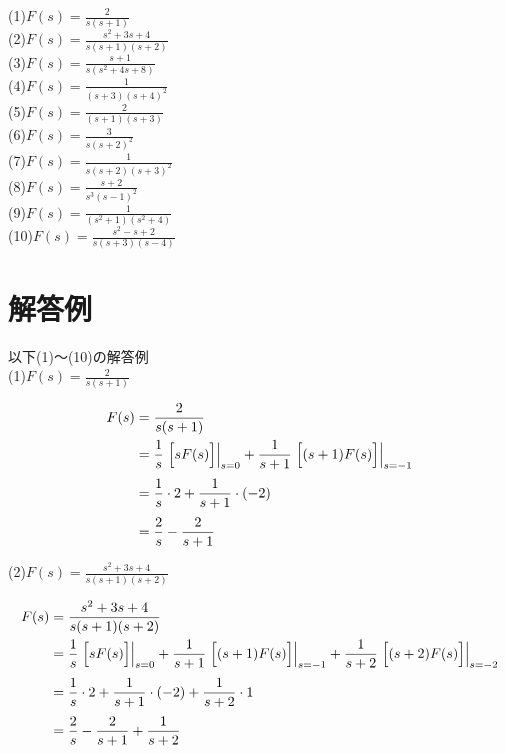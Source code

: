 \documentclass[a4paper,12pt]{report}
\begin{document}
  (1)\quad \( F(s) = \frac{2}{s(s+1)} \) \\

  (2)\quad \( F(s) = \frac{s^2 + 3s + 4}{s(s+1)(s+2)} \)\\

  (3)\quad \( F(s) = \frac{s+1}{s(s^2 + 4s + 8)} \) \\

  (4)\quad \( F(s) = \frac{1}{(s+3)(s+4)^2} \) \\

  (5)\quad \( F(s) = \frac{2}{(s+1)(s+3)} \) \\

  (6)\quad \( F(s) = \frac{3}{s(s+2)^2} \) \\

  (7)\quad \( F(s) = \frac{1}{s(s+2)(s+3)^2} \) \\

  (8)\quad \( F(s) = \frac{s+2}{s^3(s-1)^2} \) \\

  (9)\quad \( F(s) = \frac{1}{(s^2+1)(s^2+4)} \)\\
  
  (10)\quad \( F(s) = \frac{s^2 - s + 2}{s(s+3)(s-4)} \)


\chapter{解答例}

以下(1)～(10)の解答例\\

  (1)\quad \( F(s) = \frac{2}{s(s+1)} \) 

  \begin{align*}
    F(s) &= \frac{2}{s(s+1)} \\
          &= \frac{1}{s}\left.\Bigl[sF(s)\Bigr]\right|_{s=0} 
          + \frac{1}{s+1}\left.\Bigl[(s+1)F(s)\Bigr]\right|_{s=-1} \\[1mm]
          &= \frac{1}{s}\cdot 2 
          + \frac{1}{s+1}\cdot (-2) \\[1mm]
          &= \frac{2}{s} - \frac{2}{s+1}
  \end{align*} 

  (2)\quad \( F(s) = \frac{s^2 + 3s + 4}{s(s+1)(s+2)} \)
  
  \begin{align*}
    F(s) &= \frac{s^2 + 3s + 4}{s(s+1)(s+2)} \\
          &= \frac{1}{s}\left.\Bigl[sF(s)\Bigr]\right|_{s=0}
          + \frac{1}{s+1}\left.\Bigl[(s+1)F(s)\Bigr]\right|_{s=-1}
          + \frac{1}{s+2}\left.\Bigl[(s+2)F(s)\Bigr]\right|_{s=-2} \\[1mm]
          &= \frac{1}{s}\cdot 2
          + \frac{1}{s+1}\cdot (-2)
          + \frac{1}{s+2}\cdot 1 \\[1mm]
          &= \frac{2}{s} - \frac{2}{s+1} + \frac{1}{s+2}
  \end{align*}
\end{document}
